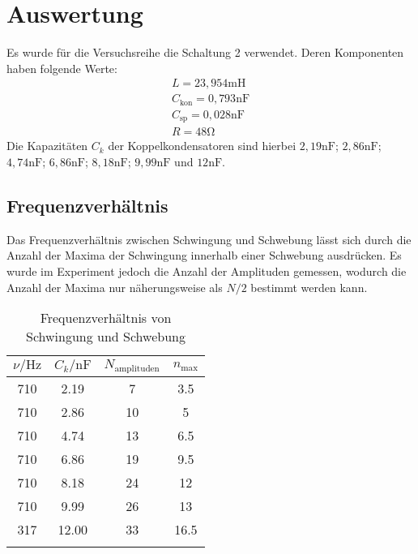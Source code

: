 \section{Auswertung}
\label{sec:Auswertung}

Es wurde für die Versuchsreihe die Schaltung 2 verwendet. Deren Komponenten haben folgende Werte:
\begin{align*}
 L = 23,954 \si{\milli\henry} \\
 C_\text{kon} = 0,793 \si{\nano\farad} \\
 C_\text{sp} = 0,028 \si{\nano\farad} \\
 R = 48 \si{\ohm} 
\end{align*}
Die Kapazitäten $C_k$ der Koppelkondensatoren sind hierbei $2,19 \si{\nano\farad}$; $2,86 \si{\nano\farad}$;
$4,74 \si{\nano\farad}$; $6,86 \si{\nano\farad}$; $8,18 \si{\nano\farad}$; $9,99 \si{\nano\farad}$ und
$12 \si{\nano\farad}$.

\subsection{Frequenzverhältnis}
Das Frequenzverhältnis zwischen Schwingung und Schwebung lässt sich durch die Anzahl der Maxima der Schwingung innerhalb
einer Schwebung ausdrücken. Es wurde im Experiment jedoch die Anzahl der Amplituden gemessen, wodurch die Anzahl der 
Maxima nur näherungsweise als $N/2$ bestimmt werden kann.  

\begin{table}
    \centering
    \caption{Frequenzverhältnis von Schwingung und Schwebung}
    \begin{tabular}{c c c c}
        \toprule
        {$\nu / \si{\hertz}$} & {$C_k / \si{\nano\farad}$} & {$N_\text{amplituden}$} & $n_\text{max}$ \\
        \midrule
        710 &  2.19 &  7 &  3.5 \\  
        710 &  2.86 & 10 &  5   \\
        710 &  4.74 & 13 &  6.5 \\
        710 &  6.86 & 19 &  9.5 \\
        710 &  8.18 & 24 & 12   \\
        710 &  9.99 & 26 & 13   \\
        317 & 12.00 & 33 & 16.5 \\
        \bottomrule
        \label{tab:a}
    \end{tabular}
\end{table}

